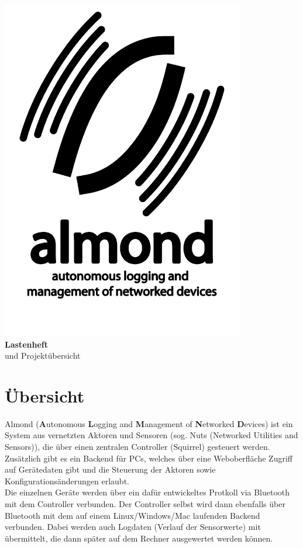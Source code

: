 \documentclass[12pt,a4paper]{article}
\begin{document}
\begin{titlepage}
	\begin{center}
		\includegraphics[height=15cm]{./logo.pdf}\\
		{\LARGE \bf Lastenheft}\\[0.3cm]
		{\large und Projektübersicht}
	\end{center}
\end{titlepage}

\tableofcontents


\section{Übersicht}

Almond ({\bf A}utonomous {\bf L}ogging and {\bf M}anagement of {\bf N}etworked {\bf D}evices) ist ein System aus vernetzten Aktoren und Sensoren (sog. Nuts (Networked Utilities and Sensors)), die über einen zentralen Controller (Squirrel) gesteuert werden. Zusätzlich gibt es ein Backend für PCs, welches über eine Weboberfläche Zugriff auf Gerätedaten gibt und die Steuerung der Aktoren sowie Konfigurationsänderungen erlaubt.\\
Die einzelnen Geräte werden über ein dafür entwickeltes Protkoll via Bluetooth mit dem Controller verbunden. Der Controller selbst wird dann ebenfalls über Bluetooth mit dem auf einem Linux/Windows/Mac laufenden Backend verbunden. Dabei werden auch Logdaten (Verlauf der Sensorwerte) mit übermittelt, die dann später auf dem Rechner ausgewertet werden können.
\end{document}
